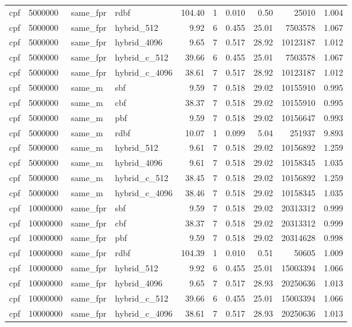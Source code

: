 \begin{tabular}{llllrrrrrr}
cpf & 5000000 & same\_fpr & rdbf & 104.40 & 1 & 0.010 & 0.50 & 25010 & 1.004 \\
cpf & 5000000 & same\_fpr & hybrid\_512 & 9.92 & 6 & 0.455 & 25.01 & 7503578 & 1.067 \\
cpf & 5000000 & same\_fpr & hybrid\_4096 & 9.65 & 7 & 0.517 & 28.92 & 10123187 & 1.012 \\
cpf & 5000000 & same\_fpr & hybrid\_c\_512 & 39.66 & 6 & 0.455 & 25.01 & 7503578 & 1.067 \\
cpf & 5000000 & same\_fpr & hybrid\_c\_4096 & 38.61 & 7 & 0.517 & 28.92 & 10123187 & 1.012 \\
cpf & 5000000 & same\_m & sbf & 9.59 & 7 & 0.518 & 29.02 & 10155910 & 0.995 \\
cpf & 5000000 & same\_m & cbf & 38.37 & 7 & 0.518 & 29.02 & 10155910 & 0.995 \\
cpf & 5000000 & same\_m & pbf & 9.59 & 7 & 0.518 & 29.02 & 10156647 & 0.993 \\
cpf & 5000000 & same\_m & rdbf & 10.07 & 1 & 0.099 & 5.04 & 251937 & 9.893 \\
cpf & 5000000 & same\_m & hybrid\_512 & 9.61 & 7 & 0.518 & 29.02 & 10156892 & 1.259 \\
cpf & 5000000 & same\_m & hybrid\_4096 & 9.61 & 7 & 0.518 & 29.02 & 10158345 & 1.035 \\
cpf & 5000000 & same\_m & hybrid\_c\_512 & 38.45 & 7 & 0.518 & 29.02 & 10156892 & 1.259 \\
cpf & 5000000 & same\_m & hybrid\_c\_4096 & 38.46 & 7 & 0.518 & 29.02 & 10158345 & 1.035 \\
cpf & 10000000 & same\_fpr & sbf & 9.59 & 7 & 0.518 & 29.02 & 20313312 & 0.999 \\
cpf & 10000000 & same\_fpr & cbf & 38.37 & 7 & 0.518 & 29.02 & 20313312 & 0.999 \\
cpf & 10000000 & same\_fpr & pbf & 9.59 & 7 & 0.518 & 29.02 & 20314628 & 0.998 \\
cpf & 10000000 & same\_fpr & rdbf & 104.39 & 1 & 0.010 & 0.51 & 50605 & 1.009 \\
cpf & 10000000 & same\_fpr & hybrid\_512 & 9.92 & 6 & 0.455 & 25.01 & 15003394 & 1.066 \\
cpf & 10000000 & same\_fpr & hybrid\_4096 & 9.65 & 7 & 0.517 & 28.93 & 20250636 & 1.013 \\
cpf & 10000000 & same\_fpr & hybrid\_c\_512 & 39.66 & 6 & 0.455 & 25.01 & 15003394 & 1.066 \\
cpf & 10000000 & same\_fpr & hybrid\_c\_4096 & 38.61 & 7 & 0.517 & 28.93 & 20250636 & 1.013 \\

\end{tabular}
